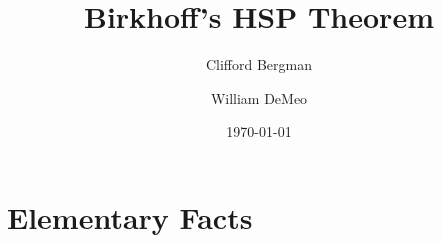 \title{Birkhoff's HSP Theorem}
\author[C.~Bergman]{Clifford Bergman}
\author[W.~DeMeo]{William DeMeo}
\date{\today}



\maketitle

\section{Elementary Facts}

